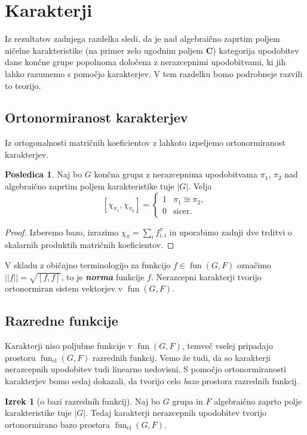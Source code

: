 \documentclass[11pt]{book}
\def\CC{\mathbf{C}}
\DeclareMathOperator\cl{cl}
\DeclareMathOperator\fun{fun}
\def\definicija{\color{rdeca}\bf\em}
\theoremstyle{definition}
\theoremstyle{zgled}
\theoremstyle{odprtproblem}
\theoremstyle{domacanaloga}
\newenvironment{dokaz}
    {\color{siva}\begin{proof}}
    {\end{proof}}
\theoremstyle{izrek}
\newtheorem*{izrek}{Izrek}
\newtheorem*{posledica}{Posledica}
\begin{document}
\section{Karakterji}

Iz rezultatov zadnjega razdelka sledi, da je nad algebraično zaprtim poljem ničelne karakteristike (na primer zelo ugodnim poljem $\CC$) kategorija upodobitev dane končne grupe popolnoma določena z nerazcepnimi upodobitvami, ki jih lahko razumemo s pomočjo karakterjev. V tem razdelku bomo podrobneje razvili to teorijo.

\subsection{Ortonormiranost karakterjev}

Iz ortogonalnosti matričnih koeficientov z lahkoto izpeljemo ortonormiranost karakterjev.

\begin{posledica}
Naj bo $G$ končna grupa z nerazcepnima upodobitvama $\pi_1$, $\pi_2$ nad algebraično zaprtim poljem karakteristike tuje $|G|$. Velja
\[
    [ \chi_{\pi_1}, \chi_{\pi_2} ] =
    \begin{cases}
        1 & \pi_1 \cong \pi_2, \\
        0 & \text{sicer.}
    \end{cases}
\]
\end{posledica}
\begin{dokaz}
Izberemo bazo, izrazimo $\chi_{\pi} = \sum_i f_{i,i}^{\pi}$ in uporabimo zadnji dve trditvi o skalarnih produktih matričnih koeficientov.
\end{dokaz}

V skladu z običajno terminologijo za funkcijo $f \in \fun(G,F)$ označimo $||f|| = \sqrt{[ f, f ]}$, to je {\definicija norma} funkcije $f$. Nerazcepni karakterji tvorijo ortonormiran sistem vektorjev v $\fun(G,F)$.

\subsection{Razredne funkcije}

Karakterji niso poljubne funkcije v $\fun(G,F)$, temveč vselej pripadajo prostoru $\fun_{\cl}(G,F)$ razrednih funkcij. Vemo že tudi, da so karakterji nerazcepnih upodobitev tudi linearno nedovisni. S pomočjo ortonormiranosti karakterjev bomo sedaj dokazali, da tvorijo celo \emph{bazo} prostora razrednih funkcij. 

\begin{izrek}[o bazi razrednih funkcij]
    Naj bo $G$ grupa in $F$ algebraično zaprto polje karakteristike tuje $|G|$. Tedaj karakterji nerazcepnih upodobitev tvorijo ortonormirano bazo prostora $\fun_{\cl}(G,F)$.
\end{izrek}
\end{document}
